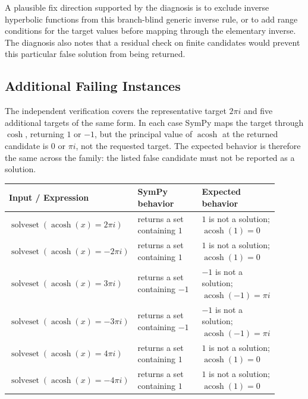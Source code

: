 \documentclass[11pt]{article}
\begin{document}
A plausible fix direction supported by the diagnosis is to exclude inverse
hyperbolic functions from this branch-blind generic inverse rule, or to add
range conditions for the target values before mapping through the elementary
inverse.  The diagnosis also notes that a residual check on finite candidates
would prevent this particular false solution from being returned.

\subsection{Additional Failing Instances}

The independent verification covers the representative target \(2\pi i\) and
five additional targets of the same form.  In each case SymPy maps the target
through \(\cosh\), returning \(1\) or \(-1\), but the principal value of
\(\operatorname{acosh}\) at the returned candidate is \(0\) or \(\pi i\), not
the requested target.  The expected behavior is therefore the same across the
family: the listed false candidate must not be reported as a solution.

\begin{center}
\footnotesize
\renewcommand{\arraystretch}{1.3}
\begin{tabular}{@{}>{\raggedright\arraybackslash}p{0.38\linewidth}>{\raggedright\arraybackslash}p{0.25\linewidth}>{\raggedright\arraybackslash}p{0.27\linewidth}@{}}
\toprule
\textbf{Input / Expression} & \textbf{SymPy behavior} & \textbf{Expected behavior} \\
\midrule
\(\operatorname{solveset}(\operatorname{acosh}(x)=2\pi i)\) & returns a set containing \(1\) & \(1\) is not a solution; \(\operatorname{acosh}(1)=0\) \\
\(\operatorname{solveset}(\operatorname{acosh}(x)=-2\pi i)\) & returns a set containing \(1\) & \(1\) is not a solution; \(\operatorname{acosh}(1)=0\) \\
\(\operatorname{solveset}(\operatorname{acosh}(x)=3\pi i)\) & returns a set containing \(-1\) & \(-1\) is not a solution; \(\operatorname{acosh}(-1)=\pi i\) \\
\(\operatorname{solveset}(\operatorname{acosh}(x)=-3\pi i)\) & returns a set containing \(-1\) & \(-1\) is not a solution; \(\operatorname{acosh}(-1)=\pi i\) \\
\(\operatorname{solveset}(\operatorname{acosh}(x)=4\pi i)\) & returns a set containing \(1\) & \(1\) is not a solution; \(\operatorname{acosh}(1)=0\) \\
\(\operatorname{solveset}(\operatorname{acosh}(x)=-4\pi i)\) & returns a set containing \(1\) & \(1\) is not a solution; \(\operatorname{acosh}(1)=0\) \\
\bottomrule
\end{tabular}
\end{center}
\end{document}

